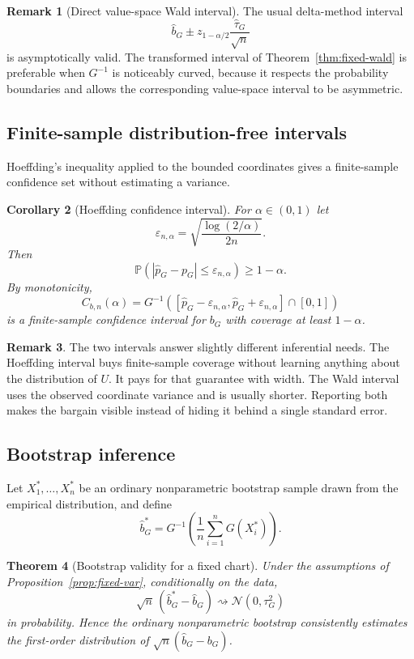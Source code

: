 \documentclass[11pt,a4paper]{article}
\newtheorem{theorem}{Theorem}[section]
\newtheorem{corollary}[theorem]{Corollary}
\theoremstyle{definition}
\newtheorem{remark}[theorem]{Remark}
\newcommand{\Prob}{\mathbb{P}}
\begin{document}
\begin{remark}[Direct value-space Wald interval]
The usual delta-method interval
\[
\widehat b_G
\pm
z_{1-\alpha/2}\frac{\widehat\tau_G}{\sqrt n}
\]
is asymptotically valid. The transformed interval of Theorem~\ref{thm:fixed-wald} is preferable when $G^{-1}$ is noticeably curved, because it respects the probability boundaries and allows the corresponding value-space interval to be asymmetric.
\end{remark}

\subsection{Finite-sample distribution-free intervals}

Hoeffding's inequality applied to the bounded coordinates gives a finite-sample confidence set without estimating a variance.

\begin{corollary}[Hoeffding confidence interval]\label{cor:hoeffding-ci}
For $\alpha\in(0,1)$ let
\[
\varepsilon_{n,\alpha}
=
\sqrt{\frac{\log(2/\alpha)}{2n}}.
\]
Then
\[
\Prob\left(
|\widehat p_G-p_G|\leq\varepsilon_{n,\alpha}
\right)\geq1-\alpha.
\]
By monotonicity,
\[
C_{b,n}(\alpha)
=
G^{-1}\!\left(
[\widehat p_G-\varepsilon_{n,\alpha},
 \widehat p_G+\varepsilon_{n,\alpha}]\cap[0,1]
\right)
\]
is a finite-sample confidence interval for $b_G$ with coverage at least $1-\alpha$.
\end{corollary}

\begin{remark}
The two intervals answer slightly different inferential needs. The Hoeffding interval buys finite-sample coverage without learning anything about the distribution of $U$. It pays for that guarantee with width. The Wald interval uses the observed coordinate variance and is usually shorter. Reporting both makes the bargain visible instead of hiding it behind a single standard error.
\end{remark}

\subsection{Bootstrap inference}

Let $X_1^*,\ldots,X_n^*$ be an ordinary nonparametric bootstrap sample drawn from the empirical distribution, and define
\[
\widehat b_G^*
=
G^{-1}\!\left(\frac1n\sum_{i=1}^nG(X_i^*)\right).
\]

\begin{theorem}[Bootstrap validity for a fixed chart]\label{thm:fixed-bootstrap}
Under the assumptions of Proposition~\ref{prop:fixed-var}, conditionally on the data,
\[
\sqrt n\,(\widehat b_G^*-\widehat b_G)
\rightsquigarrow
\mathcal N(0,\tau_G^2)
\]
in probability. Hence the ordinary nonparametric bootstrap consistently estimates the first-order distribution of $\sqrt n(\widehat b_G-b_G)$.
\end{theorem}
\end{document}
